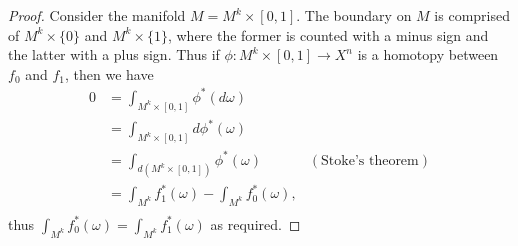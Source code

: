 \documentclass{article}
\begin{document}
\begin{enumerate}[label={\bf Q\arabic*:}]
    \begin{proof}
      Consider the manifold $M=M^k\times[0,1]$. The boundary on $M$
      is comprised of $M^k\times\{0\}$ and $M^k\times\{1\}$, where the
      former is counted with a minus sign and the latter with a plus sign.
      Thus if $\phi:M^k\times[0,1]\rightarrow X^n$ is a homotopy between
      $f_0$ and $f_1$, then we have
      \begin{align*}
        0 &=\int_{M^k\times[0,1]} \phi^*(d\omega) \\
        &=\int_{M^k\times[0,1]} d\phi^*(\omega) \\
        &=\int_{d(M^k\times[0,1])} \phi^*(\omega) &(\text{Stoke's theorem})
          \\
        &=\int_{M^k} f_1^*(\omega) - \int_{M^k} f_0^*(\omega), \\
      \end{align*}
      thus $\int_{M^k} f_0^*(\omega)= \int_{M^k} f_1^*(\omega)$ as
      required.
    \end{proof}
\end{enumerate}
\end{document}
